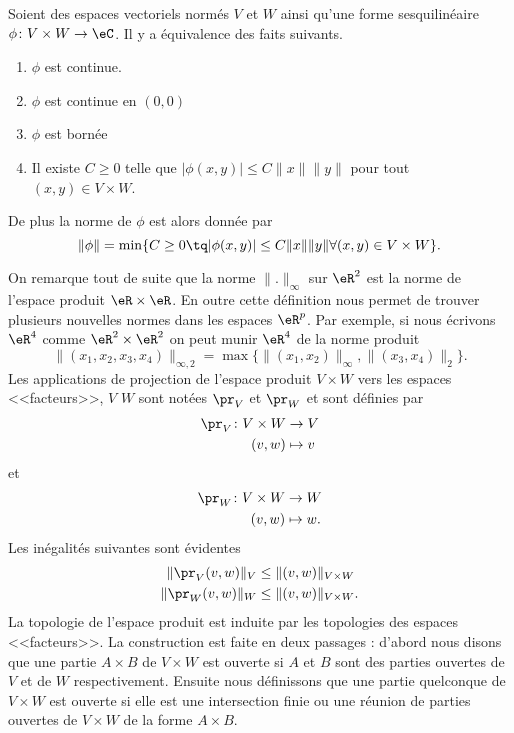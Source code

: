 \begin{proposition}      \label{PROPooQFTSooPFfbCc}
    Soient des espaces vectoriels normés \( V\) et \( W\) ainsi qu'une forme sesquilinéaire \( \phi\colon V\times W\to \eC\). Il y a équivalence des faits suivants.
    \begin{enumerate}
        \item
            \( \phi\) est continue.
        \item
            \( \phi\) est continue en \( (0,0)\)
        \item
            \( \phi\) est bornée
        \item
            Il existe \( C\geq 0\) telle que \( | \phi(x,y) |\leq C\| x \|\| y \|  \) pour tout \( (x,y)\in V\times W\).
    \end{enumerate}
    De plus la norme de \( \phi\) est alors donnée par
    \begin{equation}
        \| \phi \|=\min\{  C\geq 0\tq | \phi(x,y) |\leq C\| x \|\| y \|\forall (x,y)\in V\times W  \}.
    \end{equation}
\end{proposition}

On remarque tout de suite que la norme $\|.\|_\infty$ sur $\eR^2$ est la norme de l'espace produit $\eR\times\eR$. En outre cette définition nous permet de trouver plusieurs nouvelles normes dans les espaces $\eR^p$. Par exemple, si nous écrivons $\eR^4$ comme $\eR^2\times \eR^2$ on peut munir $\eR^4$ de la norme produit
\[
\|(x_1,x_2,x_3,x_4)\|_{\infty, 2}=\max\{\|(x_1,x_2)\|_\infty, \|(x_3,x_4)\|_2\}.
\]
Les applications de projection de l'espace produit $V\times W$ vers les espaces <<facteurs>>, $V$ $W$ sont notées $\pr_V$ et $\pr_W$ et sont définies par
\begin{equation}
	\begin{aligned}
		\pr_V\colon V\times W&\to V \\
		(v,w)&\mapsto v
	\end{aligned}
\end{equation}
et
\begin{equation}
	\begin{aligned}
		\pr_W\colon V\times W &\to W \\
		(v,w)&\mapsto w.
	\end{aligned}
\end{equation}
Les inégalités suivantes sont évidentes
\begin{equation}
	\begin{aligned}[]
		\|\pr_V(v,w)\|_V&\leq \|(v,w)\|_{V\times W} \\
		\|\pr_W(v,w)\|_W&\leq \|(v,w)\|_{V\times W}.
	\end{aligned}
\end{equation}
La topologie de l'espace produit est induite par les topologies des espaces <<facteurs>>. La construction est faite en deux passages : d'abord nous disons que une partie $A\times B$ de $V\times W$ est ouverte si $A$ et $B$ sont des parties ouvertes de $V$ et de $W$ respectivement.  Ensuite nous définissons que une partie quelconque de $V\times W$ est ouverte si elle est une intersection finie ou une réunion de parties ouvertes de $V\times W$ de la forme $A\times B$.

